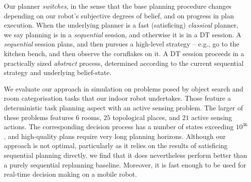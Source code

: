Our planner {\em switches}, in the sense that the base planning
procedure changes depending on our robot's subjective degrees of
belief, and on progress in plan execution. When the underlying planner is
a fast (satisficing) {\em classical} planner, we say planning is in a
{\em sequential} session, and otherwise it is in a DT session.
A {\em sequential} session plans, and then pursues a high-level
strategy -- e.g., go to the kitchen bench, and then observe the
cornflakes on it.
A DT session proceeds in a practically sized {\em abstract} process,
determined according to the current sequential strategy and underlying
belief-state.


We evaluate our approach in simulation on problems posed by object search and room categorisation tasks that our indoor
robot undertakes. Those feature a deterministic task planning aspect
with an active sensing problem. The larger of these problems features
$6$ rooms, $25$ topological places, and $21$ active sensing
actions. The corresponding decision process has a number of states
exceeding $10^{36}$, and high-quality plans require very long planning
horizons.
Although our approach is not optimal, particularly as it relies on the
results of satisficing sequential planning directly, we find that it
does nevertheless perform better than a purely sequential replanning
baseline. Moreover, it is fast enough to be used for real-time
decision making on a mobile robot.
